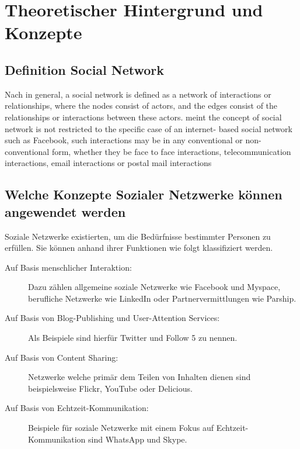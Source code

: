 
\chapter{Theoretischer Hintergrund und Konzepte}


\section{Definition Social Network}


Nach \textcite[S. 2]{aggarwal:sn} \glqq in general, a social network is defined as a network of interactions or relationships, where the nodes consist of actors, and the edges consist of the relationships or interactions between these actors.\grqq \textcite{aggarwal:sn} meint \glqq the concept of social network is not restricted to the specific case of an internet- based social network such as Facebook, such interactions may be in any conventional or non-conventional form, whether they be face to face interactions, telecommunication interactions, email interactions or postal mail interactions\grqq


\section{Welche Konzepte Sozialer Netzwerke können angewendet werden}

Soziale Netzwerke existierten, um die Bedürfnisse bestimmter Personen zu erfüllen. Sie können anhand ihrer Funktionen wie folgt klassifiziert werden.

\begin{description}
\item[Auf Basis menschlicher Interaktion:] Dazu zählen allgemeine soziale Netzwerke wie Facebook und Myspace, berufliche Netzwerke wie LinkedIn oder Partnervermittlungen wie Parship.
\item[Auf Basis von Blog-Publishing und User-Attention Services:] Als Beispiele sind hierfür Twitter und Follow 5 zu nennen.
\item[Auf Basis von Content Sharing:] Netzwerke welche primär dem Teilen von Inhalten dienen sind beispielsweise Flickr, YouTube oder Delicious.
\item[Auf Basis von Echtzeit-Kommunikation:] Beispiele für soziale Netzwerke mit einem Fokus auf Echtzeit-Kommunikation sind WhatsApp und Skype.
\end{description}

